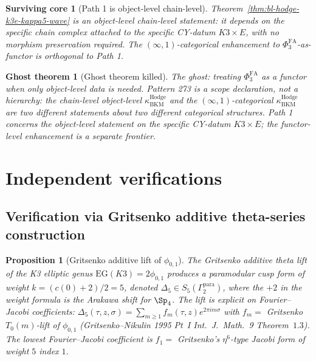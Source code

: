 \documentclass[11pt]{article}
\newtheorem{proposition}[theorem]{Proposition}
\newtheorem{surviving}[theorem]{Surviving core}
\newtheorem{ghost}[theorem]{Ghost theorem}
\providecommand{\kHodge}{\kappa_{\mathrm{BKM}}^{\mathrm{Hodge}}}
\providecommand{\PhiFA}{\Phi^{\mathrm{FA}}}
\begin{document}
\begin{surviving}[Path 1 is object-level chain-level]
\label{surv:pattern-273-BL-2}
Theorem~\ref{thm:bl-hodge-k3e-kappa5-wave} is an object-level
chain-level statement: it depends on the specific chain complex
attached to the specific CY-datum $K3 \times E$, with no morphism
preservation required. The $(\infty, 1)$-categorical enhancement to
$\PhiFA_3$-as-functor is orthogonal to Path 1.
\end{surviving}

\begin{ghost}[Ghost theorem killed]
\label{ghost:pattern-273-BL-2}
The ghost: treating $\PhiFA_3$ as a functor when only object-level data
is needed. Pattern 273 is a scope declaration, not a hierarchy: the
chain-level object-level $\kHodge$ and the $(\infty, 1)$-categorical
$\kHodge$ are \emph{two different statements} about two different
categorical structures. Path 1 concerns the object-level statement on
the specific CY-datum $K3 \times E$; the functor-level enhancement is
a separate frontier.
\end{ghost}

\section{Independent verifications}
\label{sec:independent}

\subsection{Verification via Gritsenko additive theta-series construction}

\begin{proposition}[Gritsenko additive lift of $\phi_{0, 1}$]
\label{prop:gritsenko-additive-BL-2}
The Gritsenko additive theta lift of the K3 elliptic genus $\mathrm{EG}(K3)
= 2\phi_{0, 1}$ produces a paramodular cusp form of weight $k = (c(0) + 2)/2
= 5$, denoted $\Delta_5 \in S_5(\Gamma_2^{\mathrm{para}})$, where the
$+2$ in the weight formula is the Arakawa shift for $\Sp_4$. The lift
is explicit on Fourier--Jacobi coefficients: $\Delta_5(\tau, z, \sigma)
= \sum_{m \geq 1} f_m(\tau, z) e^{2\pi i m \sigma}$ with
$f_m = $ Gritsenko $T_0(m)$-lift of $\phi_{0, 1}$ (Gritsenko--Nikulin 1995
Pt~I \emph{Int.\ J.\ Math.}~9 Theorem~$1.3$). The lowest Fourier--Jacobi
coefficient is $f_1 = $ Gritsenko's $\eta^6$-type Jacobi form of weight $5$
index $1$.
\end{proposition}
\end{document}
